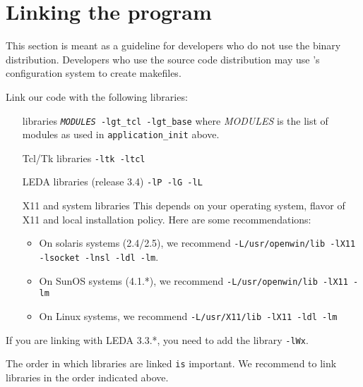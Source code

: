 \documentclass[twoside,fleqn]{report}
\begin{document}
%
%
%

\section{Linking the program}

\begin{WhoCanSkipThis}  
  This section is meant as a guideline for developers who do not use
  the binary distribution. Developers who use the source code
  distribution may use \Graphlet{}'s configuration system to create
  makefiles.  
\end{WhoCanSkipThis}

Link our code with the following libraries:

\begin{enumerate}

  \item[\Graphlet{} libraries]
  \texttt{\emph{MODULES} -lgt\_tcl -lgt\_base} where \emph{MODULES} is 
  the list of modules as used in \texttt{application\_init} above.
  
  \item[Tcl/Tk libraries]
  \texttt{-ltk -ltcl}

  \item[LEDA libraries (release 3.4)]  
  \texttt{-lP -lG -lL}
  
  \item[X11 and system libraries]
  This depends on your operating system, flavor of X11 and
  local installation policy. Here are some recommendations:
  \begin{itemize}
    \item On solaris systems (2.4/2.5), we recommend
    \texttt{-L/usr/openwin/lib -lX11 -lsocket -lnsl -ldl -lm}.
    
    \item On SunOS systems (4.1.*), we recommend
    \texttt{-L/usr/openwin/lib -lX11 -lm} 
    
    \item On Linux systems, we recommend
    \texttt{-L/usr/X11/lib -lX11 -ldl -lm}
  \end{itemize}
  
\end{enumerate}

\begin{notes}
  \item If you are linking with LEDA 3.3.*, you need to add the library 
  \texttt{-lWx}.
  \item The order in which libraries are linked \texttt{is} important.  
  We recommend to link libraries in the order indicated above.
\end{notes}
\end{document}
